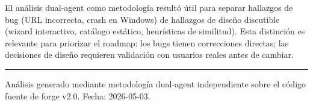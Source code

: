 \documentclass[11pt,a4paper]{article}
\begin{document}
El análisis dual-agent como metodología resultó útil para separar hallazgos de bug (URL incorrecta, crash en Windows) de hallazgos de diseño discutible (wizard interactivo, catálogo estático, heurísticas de similitud). Esta distinción es relevante para priorizar el roadmap: los bugs tienen correcciones directas; las decisiones de diseño requieren validación con usuarios reales antes de cambiar.

\vspace{2em}
\hrule
\vspace{0.5em}
{\small\color{forgegray} Análisis generado mediante metodología dual-agent independiente sobre el código fuente de forge v2.0. Fecha: 2026-05-03.}
\end{document}
